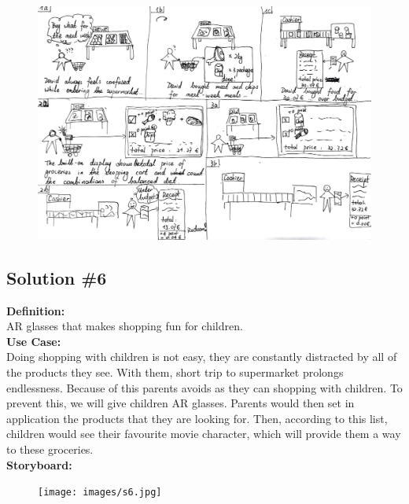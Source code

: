 \documentclass[a4paper,10pt,oneside]{scrreprt}
\begin{document}
				\begin{figure}[h]
					\centering
					\includegraphics[scale=0.4, clip, trim={0em 0em 0em 0em}]{images/s5.jpg}
				\end{figure}

			\clearpage
			
		\subsection{Solution \#6}
		
		\noindent \textbf{Definition:}\\
		AR glasses that makes shopping fun for children.\\
		
		
		\noindent \textbf{Use Case:}\\
		Doing shopping with children is not easy, they are constantly distracted by all of the products they see. With them, short trip to supermarket prolongs endlessness. Because of this parents avoids as they can shopping with children.
To prevent this, we will give children AR glasses. Parents would then set in application the products that they are looking for. Then, according to this list, children would see their favourite movie character, which will provide them a way to these groceries.\\
		
		
			\noindent \textbf{Storyboard:}\\

			\begin{figure}[h]
				\centering
				\texttt{[image: images/s6.jpg]}
			\end{figure}
\end{document}
